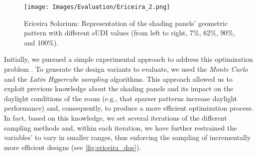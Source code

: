 
\begin{figure}[htpb]
	\centering
	\texttt{[image: Images/Evaluation/Ericeira\_2.png]}
	\caption[Ericeira Solarium: Different representations of the shading panels’ geometric pattern]{Ericeira Solarium: Representation of the shading panels’ geometric pattern with different sUDI values (from left to right, 7\%, 62\%, 90\%, and 100\%).}
	\label{fig:ericeira_multiple_panels}
\end{figure}

Initially, we pursued a simple experimental approach to address this optimization problem \cite{Caetano2018}. To generate the design variants to evaluate, we used the \textit{Monte Carlo} and the \textit{Latin Hypercube sampling} algorithms. This approach allowed us to exploit previous knowledge about the shading panels and its impact on the daylight conditions of the room (e.g., that sparser patterns increase daylight performance) and, consequently, to produce a more efficient optimization process. In fact, based on this knowledge, we set several iterations of the different sampling methods and, within each iteration, we have further restrained the variables' to vary in smaller ranges, thus enforcing the sampling of incrementally more efficient designs (see \cref{fig:ericeira_doe}). %


